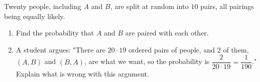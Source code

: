 Twenty people, including $A$ and $B$, are split at random into $10$ pairs, all pairings being equally likely.
\begin{enumerate}
\item[(a)] Find the probability that $A$ and $B$ are paired with each other.
\item[(b)] A student argues: "There are $20\cdot19$ ordered pairs of people, and $2$ of them, $(A,B)$ and $(B,A)$, are what we want, so the probability is $\dfrac{2}{20\cdot19}=\dfrac{1}{190}$." Explain what is wrong with this argument.
\end{enumerate}

